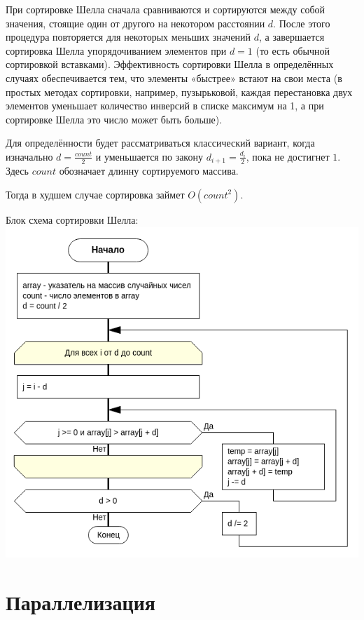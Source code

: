\documentclass[a4paper, 12pt]{article}
\begin{document}
При сортировке Шелла сначала сравниваются и сортируются между собой значения, стоящие один от другого на некотором расстоянии $d$. После этого процедура повторяется для некоторых меньших значений $d$, а завершается сортировка Шелла упорядочиванием элементов при $d = 1$ (то есть обычной сортировкой вставками). Эффективность сортировки Шелла в определённых случаях обеспечивается тем, что элементы «быстрее» встают на свои места (в простых методах сортировки, например, пузырьковой, каждая перестановка двух элементов уменьшает количество инверсий в списке максимум на 1, а при сортировке Шелла это число может быть больше).

Для определённости будет рассматриваться классический вариант, когда изначально $d = \frac{count}{2}$ и уменьшается по закону $d_{i+1} = \frac{d_{i}}{2}$, пока не достигнет $1$. Здесь $count$ обозначает длинну сортируемого массива.

Тогда в худшем случае сортировка займет $O(count^2)$.

Блок схема сортировки Шелла:\\
\includegraphics[scale=0.6]{res/original.png}



\section{Параллелизация}
\end{document}

